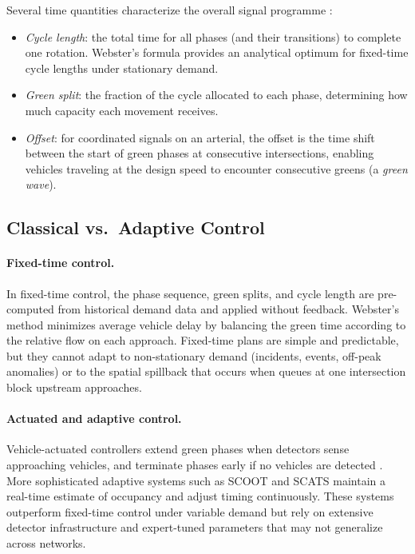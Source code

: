 Several time quantities characterize the overall signal programme \citep{koonce2008signal}:
\begin{itemize}
  \item \emph{Cycle length}: the total time for all phases (and their transitions) to complete one rotation. Webster's formula \citep{webster1958traffic} provides an analytical optimum for fixed-time cycle lengths under stationary demand.
  \item \emph{Green split}: the fraction of the cycle allocated to each phase, determining how much capacity each movement receives.
  \item \emph{Offset}: for coordinated signals on an arterial, the offset is the time shift between the start of green phases at consecutive intersections, enabling vehicles traveling at the design speed to encounter consecutive greens (a \emph{green wave}).
\end{itemize}

\subsection{Classical vs.\ Adaptive Control}
\label{sec:TheoreticalBackground_AdditionalTrafficConcepts}

\paragraph{Fixed-time control.}
In fixed-time control, the phase sequence, green splits, and cycle length are pre-computed from historical demand data and applied without feedback. Webster's method minimizes average vehicle delay by balancing the green time according to the relative flow on each approach. Fixed-time plans are simple and predictable, but they cannot adapt to non-stationary demand (incidents, events, off-peak anomalies) or to the spatial spillback that occurs when queues at one intersection block upstream approaches.

\paragraph{Actuated and adaptive control.}
Vehicle-actuated controllers extend green phases when detectors sense approaching vehicles, and terminate phases early if no vehicles are detected \citep{koonce2008signal}. More sophisticated adaptive systems such as SCOOT \citep{hunt1981scoot} and SCATS \citep{lowrie1990scats} maintain a real-time estimate of occupancy and adjust timing continuously. These systems outperform fixed-time control under variable demand but rely on extensive detector infrastructure and expert-tuned parameters that may not generalize across networks.

